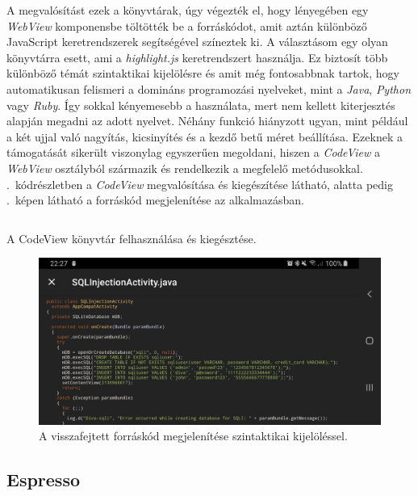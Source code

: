 \documentclass{thesis-ekf}
\theoremstyle{definition}
\theoremstyle{remark}
\begin{document}
A megvalósítást ezek a könyvtárak, úgy végezték el, hogy lényegében egy \emph{WebView} komponensbe töltötték be a forráskódot, amit aztán különböző JavaScript keretrendszerek segítségével színeztek ki.
A választásom egy olyan könyvtárra esett, ami a \emph{highlight.js} keretrendszert használja.
Ez biztosít több különböző témát szintaktikai kijelölésre és amit még fontosabbnak tartok, hogy automatikusan felismeri a domináns programozási nyelveket, mint a \emph{Java}, \emph{Python} vagy \emph{Ruby}.
Így sokkal kényemesebb a használata, mert nem kellett kiterjesztés alapján megadni az adott nyelvet.
Néhány funkció hiányzott ugyan, mint például a két ujjal való nagyítás, kicsinyítés és a kezdő betű méret beállítása.
Ezeknek a támogatását sikerült viszonylag egyszerűen megoldani, hiszen a \emph{CodeView} a \emph{WebView} osztályból származik és rendelkezik a megfelelő metódusokkal.
.~kódrészletben a \emph{CodeView} megvalósítása és kiegészítése látható, alatta pedig .~képen látható a forráskód megjelenítése az alkalmazásban.

\inputminted[linenos, breaklines]{java}{./codes/codeview.java}
\begin{listing}[H]
    \caption{A CodeView könyvtár felhasználása és kiegésztése.}
    \label{codeviewimplementation}
\end{listing}

\begin{figure}[!h]
	\centering
	\includegraphics[width=15cm]{pictures/codeview}
	\caption{A visszafejtett forráskód megjelenítése szintaktikai kijelöléssel.}
	\label{codeview}
\end{figure}

\newpage

\subsection{Espresso}
\end{document}
